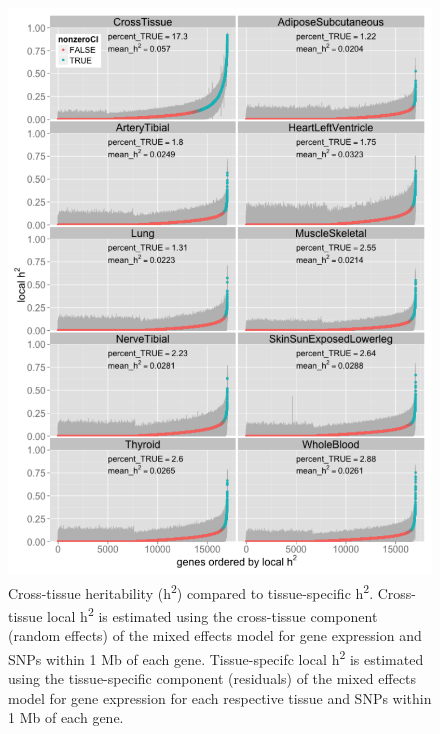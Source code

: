 \documentclass[]{article}
\begin{document}
\begin{figure}[htbp]
\centering
\includegraphics{GenArch_manuscript_files/figure-latex/otdTSh2-1.pdf}
\caption{Cross-tissue heritability (h\textsuperscript{2}) compared to
tissue-specific h\textsuperscript{2}. Cross-tissue local
h\textsuperscript{2} is estimated using the cross-tissue component
(random effects) of the mixed effects model for gene expression and SNPs
within 1 Mb of each gene. Tissue-specifc local h\textsuperscript{2} is
estimated using the tissue-specific component (residuals) of the mixed
effects model for gene expression for each respective tissue and SNPs
within 1 Mb of each gene.}
\end{figure}
\end{document}
